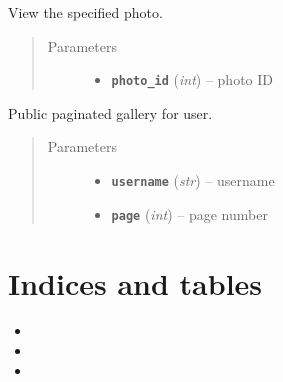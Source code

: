 \documentclass[letterpaper,10pt,english]{sphinxmanual}
\begin{document}
\begin{fulllineitems}
\label{users:get--user-photo-(int-photo_id)}
View the specified photo.
\begin{quote}\begin{description}
\item[{Parameters}] \leavevmode\begin{itemize}
\item {} 
\textbf{\texttt{photo\_id}} (\emph{int}) -- photo ID

\end{itemize}

\end{description}\end{quote}

\end{fulllineitems}



\begin{fulllineitems}
\label{users:get--user-(username)-gallery}
Public paginated gallery for user.
\begin{quote}\begin{description}
\item[{Parameters}] \leavevmode\begin{itemize}
\item {} 
\textbf{\texttt{username}} (\emph{str}) -- username

\item {} 
\textbf{\texttt{page}} (\emph{int}) -- page number

\end{itemize}

\end{description}\end{quote}

\end{fulllineitems}



\chapter{Indices and tables}
\label{index:indices-and-tables}\begin{itemize}
\item {} 

\item {} 

\item {} 

\end{itemize}
\end{document}
